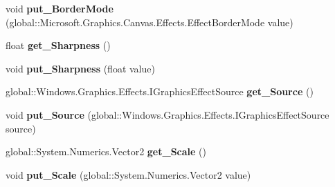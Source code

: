 \begin{DoxyCompactItemize}
void {\bfseries put\+\_\+\+Border\+Mode} (global\+::\+Microsoft.\+Graphics.\+Canvas.\+Effects.\+Effect\+Border\+Mode value)
\item 
\mbox{\label{interface_microsoft_1_1_graphics_1_1_canvas_1_1_effects_1_1_i_scale_effect_a76ce1ef01a06978e684a4618f550223f}} 
float {\bfseries get\+\_\+\+Sharpness} ()
\item 
\mbox{\label{interface_microsoft_1_1_graphics_1_1_canvas_1_1_effects_1_1_i_scale_effect_afab0f505adbbffee701a263c3e62fe43}} 
void {\bfseries put\+\_\+\+Sharpness} (float value)
\item 
\mbox{\label{interface_microsoft_1_1_graphics_1_1_canvas_1_1_effects_1_1_i_scale_effect_a5d893ef5b6101520f8cfba14fe6da905}} 
global\+::\+Windows.\+Graphics.\+Effects.\+I\+Graphics\+Effect\+Source {\bfseries get\+\_\+\+Source} ()
\item 
\mbox{\label{interface_microsoft_1_1_graphics_1_1_canvas_1_1_effects_1_1_i_scale_effect_ad103c9b390384b145ae6c1e98f30522e}} 
void {\bfseries put\+\_\+\+Source} (global\+::\+Windows.\+Graphics.\+Effects.\+I\+Graphics\+Effect\+Source source)
\item 
\mbox{\label{interface_microsoft_1_1_graphics_1_1_canvas_1_1_effects_1_1_i_scale_effect_afae9f41434e94bb89958e555bf403b47}} 
global\+::\+System.\+Numerics.\+Vector2 {\bfseries get\+\_\+\+Scale} ()
\item 
\mbox{\label{interface_microsoft_1_1_graphics_1_1_canvas_1_1_effects_1_1_i_scale_effect_a2945fd65d3f7df0e167dd527632d4244}} 
void {\bfseries put\+\_\+\+Scale} (global\+::\+System.\+Numerics.\+Vector2 value)
\item 
\mbox{\label{interface_microsoft_1_1_graphics_1_1_canvas_1_1_effects_1_1_i_scale_effect_abaa43e3b0b5b6f89987efd1e0930c4fa}} 

\end{DoxyCompactItemize}
